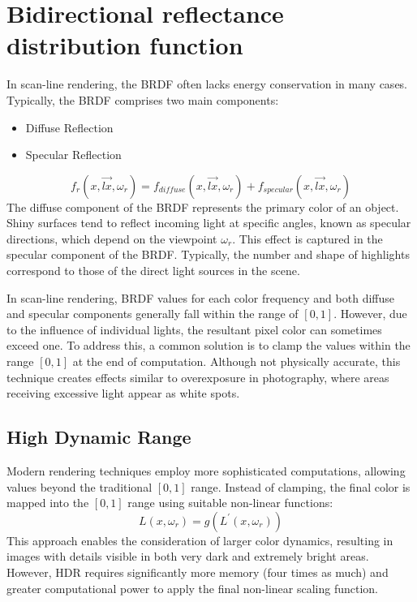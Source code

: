 \section{Bidirectional reflectance distribution function}

In scan-line rendering, the BRDF often lacks energy conservation in many cases. 
Typically, the BRDF comprises two main components:
\begin{itemize}
    \item Diffuse Reflection
    \item Specular Reflection
\end{itemize}
\[f_r(x,\overrightarrow{lx},\omega_r)=f_{diffuse}(x,\overrightarrow{lx},\omega_r)+f_{specular}(x,\overrightarrow{lx},\omega_r)\]
The diffuse component of the BRDF represents the primary color of an object. 
Shiny surfaces tend to reflect incoming light at specific angles, known as specular directions, which depend on the viewpoint $\omega_r$.
This effect is captured in the specular component of the BRDF. 
Typically, the number and shape of highlights correspond to those of the direct light sources in the scene.

In scan-line rendering, BRDF values for each color frequency and both diffuse and specular components generally fall within the range of $[0,1]$. 
However, due to the influence of individual lights, the resultant pixel color can sometimes exceed one. 
To address this, a common solution is to clamp the values within the range $[0,1]$ at the end of computation. 
Although not physically accurate, this technique creates effects similar to overexposure in photography, where areas receiving excessive light appear as white spots.

\subsection{High Dynamic Range}
Modern rendering techniques employ more sophisticated computations, allowing values beyond the traditional $[0,1]$ range. 
Instead of clamping, the final color is mapped into the $[0,1]$ range using suitable non-linear functions:
\[L(x,\omega_r)=g(L^\prime(x,\omega_r))\]
This approach enables the consideration of larger color dynamics, resulting in images with details visible in both very dark and extremely bright areas. 
However, HDR requires significantly more memory (four times as much) and greater computational power to apply the final non-linear scaling function.